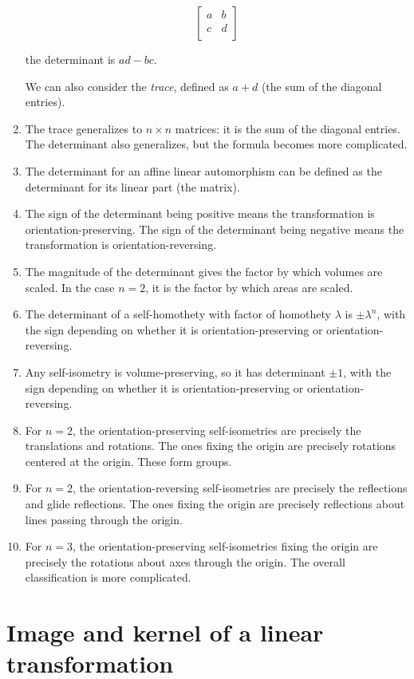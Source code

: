 \documentclass[10pt]{amsart}
\begin{document}
\begin{enumerate}
  $$\left[\begin{matrix} a & b \\ c & d \\\end{matrix}\right]$$

  the determinant is $ad - bc$.

  We can also consider the {\em trace}, defined as $a + d$ (the sum of
  the diagonal entries).
\item The trace generalizes to $n \times n$ matrices: it is the sum of
  the diagonal entries. The determinant also generalizes, but the
  formula becomes more complicated.
\item The determinant for an affine linear automorphism can be defined
  as the determinant for its linear part (the matrix).
\item The sign of the determinant being positive means the
  transformation is orientation-preserving. The sign of the
  determinant being negative means the transformation is
  orientation-reversing.
\item The magnitude of the determinant gives the factor by which
  volumes are scaled. In the case $n = 2$, it is the factor by which
  areas are scaled.
\item The determinant of a self-homothety with factor of homothety
  $\lambda$ is $\pm \lambda^n$, with the sign depending on whether it
  is orientation-preserving or orientation-reversing.
\item Any self-isometry is volume-preserving, so it has determinant
  $\pm 1$, with the sign depending on whether it is
  orientation-preserving or orientation-reversing.
\item For $n = 2$, the orientation-preserving self-isometries are
  precisely the translations and rotations. The ones fixing the origin
  are precisely rotations centered at the origin. These form groups.
\item For $n = 2$, the orientation-reversing self-isometries are
  precisely the reflections and glide reflections. The ones fixing the
  origin are precisely reflections about lines passing through the
  origin.
\item For $n = 3$, the orientation-preserving self-isometries fixing
  the origin are precisely the rotations about axes through the
  origin. The overall classification is more complicated.
\end{enumerate}

\section{Image and kernel of a linear transformation}
\end{document}
